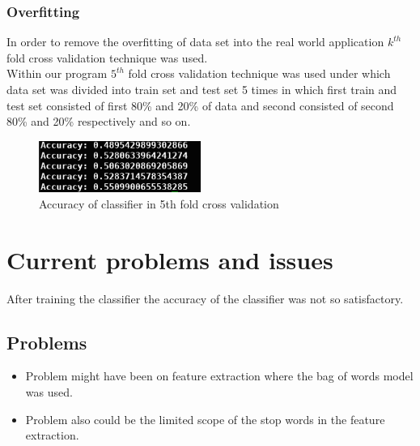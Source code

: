 \documentclass[a4paper, 12pt, onepage]{article}
\begin{document}
	\subsubsection{Overfitting}
	In order to remove the overfitting of data set into the real world application $k^{th}$ fold cross validation technique was used. \\
	Within our program $5^{th}$ fold cross validation technique was used under which data set was divided into train set and test set 5 times in which first train and test set consisted of first 80\% and 20\% of data and second consisted of second 80\% and 20\% respectively and so on.
      \begin{figure}[h!]
	      \centering
	      \includegraphics[width=200px]{accuracy.png}
	      \caption{Accuracy of classifier in 5th fold cross validation}
	\end{figure}


      \cleardoublepage
      \section{Current problems and issues}
      After training  the classifier the accuracy of the classifier was not so satisfactory.
      \subsection{Problems}
      \begin{itemize}
	\item Problem might have been on feature extraction where the bag of words model was used.
	\item Problem also could be the limited scope of the stop words in the feature extraction.
	\end{itemize}
\end{document}
